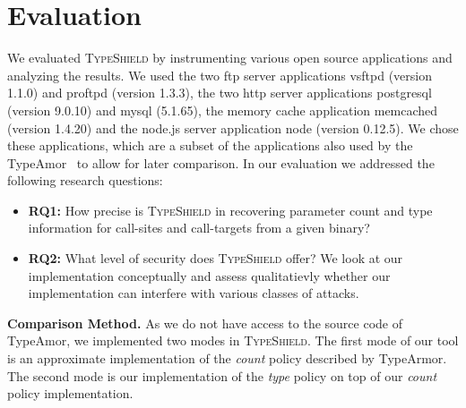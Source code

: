 \section{Evaluation}
\label{chapter:Evaluation}
We evaluated \textsc{TypeShield} by instrumenting various open source applications and analyzing the results. 
We used the two ftp server applications vsftpd (version 1.1.0) and proftpd (version 1.3.3), the two http server 
applications postgresql (version 9.0.10) and  mysql (5.1.65), the memory cache application memcached (version 1.4.20) 
and the node.js server application node (version 0.12.5). We chose these applications, which are a subset of the 
applications also used by the TypeAmor~\cite{veen:typearmor} to allow for later comparison.
In our evaluation we addressed the following research questions:
\begin{itemize}

 \item \textbf{RQ1:} How precise is \textsc{TypeShield} in recovering parameter count and type information for call-sites and call-targets from a given binary?

 \item \textbf{RQ2:} What level of security does \textsc{TypeShield} offer?
 We look at our implementation conceptually and assess qualitatievly whether our implementation can interfere with various classes of attacks. 

% 
\end{itemize}
\textbf{Comparison Method.} As we do not have access to the source code of TypeAmor, we implemented two modes in \textsc{TypeShield}. 
The first mode of our tool is an approximate implementation of the \textit{count} 
policy described by TypeArmor. The second mode is our implementation of the \textit{type} policy on
top of our \textit{count} policy implementation. 
%

